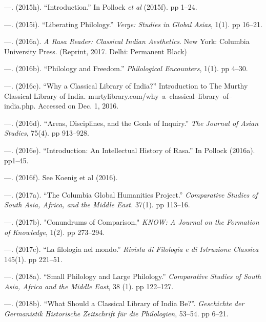  \item —. (2015h). “Introduction.” In Pollock \textit{et al} (2015f). pp 1–24.

 \item —. (2015i). “Liberating Philology.” \textit{Verge: Studies in Global Asias}, 1(1). pp 16–21.

 \item —. (2016a). \textit{A Rasa Reader: Classical Indian Aesthetics}. New York: Columbia University Press. (Reprint, 2017. Delhi: Permanent Black)

 \item —. (2016b). “Philology and Freedom.” \textit{Philological Encounters}, 1(1). pp 4–30.

 \item —. (2016c). “Why a Classical Library of India?” Introduction to The Murthy Classical Library of India. murtylibrary.com/why–a–classical–library–of–india.php. Accessed on Dec. 1, 2016.

 \item —. (2016d). “Areas, Disciplines, and the Goals of Inquiry.” \textit{The Journal of Asian Studies}, 75(4). pp 913–928.

 \item —. (2016e). “Introduction: An Intellectual History of Rasa.” In Pollock (2016a). pp1–45.

 \item —. (2016f). See Koenig et al (2016).

 \item —. (2017a). “The Columbia Global Humanities Project.” \textit{Comparative Studies of South Asia, Africa, and the Middle East.} 37(1). pp 113–16.

 \item —. (2017b). "Conundrums of Comparison," \textit{KNOW: A Journal on the Formation of Knowledge}, 1(2). pp 273–294.

 \item —. (2017c). “La filologia nel mondo.” \textit{Rivista di Filologia e di Istruzione Classica} 145(1). pp 221–51.

 \item —. (2018a). “Small Philology and Large Philology.” \textit{Comparative Studies of South Asia, Africa and the Middle East}, 38 (1). pp 122–127.

 \item —. (2018b). “What Should a Classical Library of India Be?”. \textit{Geschichte der Germanistik Historische Zeitschrift für die Philologien}, 53–54. pp 6–21.

